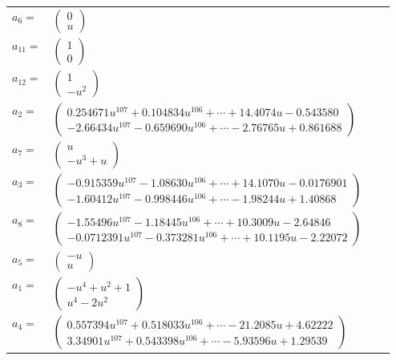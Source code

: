 \documentclass[1p]{elsarticle_modified}
\theoremstyle{definition}
\begin{document}
\begin{tabular}{m{7pt} m{180pt} m{7pt} m{180pt} }
\flushright $a_{6}=$&$\begin{pmatrix}0\\u\end{pmatrix}$ \\
\flushright $a_{11}=$&$\begin{pmatrix}1\\0\end{pmatrix}$ \\
\flushright $a_{12}=$&$\begin{pmatrix}1\\- u^2\end{pmatrix}$ \\
\flushright $a_{2}=$&$\begin{pmatrix}0.254671 u^{107}+0.104834 u^{106}+\cdots+14.4074 u-0.543580\\-2.66434 u^{107}-0.659690 u^{106}+\cdots-2.76765 u+0.861688\end{pmatrix}$ \\
\flushright $a_{7}=$&$\begin{pmatrix}u\\- u^3+u\end{pmatrix}$ \\
\flushright $a_{3}=$&$\begin{pmatrix}-0.915359 u^{107}-1.08630 u^{106}+\cdots+14.1070 u-0.0176901\\-1.60412 u^{107}-0.998446 u^{106}+\cdots-1.98244 u+1.40868\end{pmatrix}$ \\
\flushright $a_{8}=$&$\begin{pmatrix}-1.55496 u^{107}-1.18445 u^{106}+\cdots+10.3009 u-2.64846\\-0.0712391 u^{107}-0.373281 u^{106}+\cdots+10.1195 u-2.22072\end{pmatrix}$ \\
\flushright $a_{5}=$&$\begin{pmatrix}- u\\u\end{pmatrix}$ \\
\flushright $a_{1}=$&$\begin{pmatrix}- u^4+u^2+1\\u^4-2 u^2\end{pmatrix}$ \\
\flushright $a_{4}=$&$\begin{pmatrix}0.557394 u^{107}+0.518033 u^{106}+\cdots-21.2085 u+4.62222\\3.34901 u^{107}+0.543398 u^{106}+\cdots-5.93596 u+1.29539\end{pmatrix}$ \\

\end{tabular}
\end{document}
